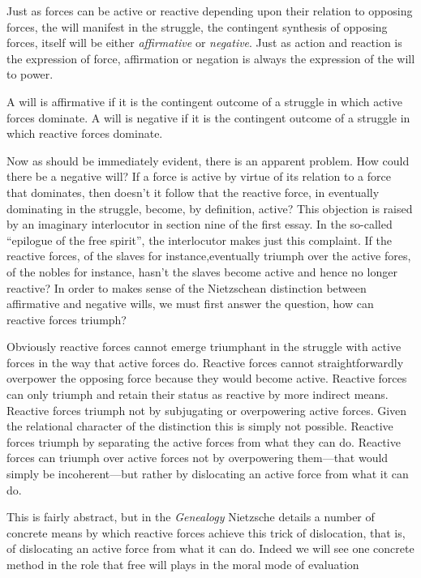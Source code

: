 Just as forces can be active or reactive depending upon their relation to opposing forces, the will manifest in the struggle, the contingent synthesis of opposing forces, itself will be either \emph{affirmative} or \emph{negative}. Just as action and reaction is the expression of force, affirmation or negation is always the expression of the will to power.

A will is affirmative if it is the contingent outcome of a struggle in which active forces dominate. A will is negative if it is the contingent outcome of a struggle in which reactive forces dominate. 

Now as should be immediately evident, there is an apparent problem. How could there be a negative will? If a force is active by virtue of its relation to a force that dominates, then doesn't it follow that the reactive force, in eventually dominating in the struggle, become, by definition, active? This objection is raised by an imaginary interlocutor in section nine of the first essay. In the so-called ``epilogue of the free spirit'', the interlocutor makes just this complaint. If the reactive forces, of the slaves for instance,eventually triumph over the active fores, of the nobles for instance, hasn't the slaves become active and hence no longer reactive? In order to makes sense of the Nietzschean distinction between affirmative and negative wills, we must first answer the question, how can reactive forces triumph?

Obviously reactive forces cannot emerge triumphant in the struggle with active forces in the way that active forces do. Reactive forces cannot straightforwardly overpower the opposing force because they would become active. Reactive forces can only triumph and retain their status as reactive by more indirect means. Reactive forces triumph not by subjugating or overpowering active forces. Given the relational character of the distinction this is simply not possible. Reactive forces triumph by separating the active forces from what they can do. Reactive forces can  triumph over active forces not by overpowering them---that would simply be incoherent---but rather by dislocating an active force from what it can do. 

This is fairly abstract, but in the \emph{Genealogy} Nietzsche details a number of concrete means by which reactive forces achieve this trick of dislocation, that is, of dislocating an active force from what it can do. Indeed we will see one concrete method in the role that free will plays in the moral mode of evaluation

